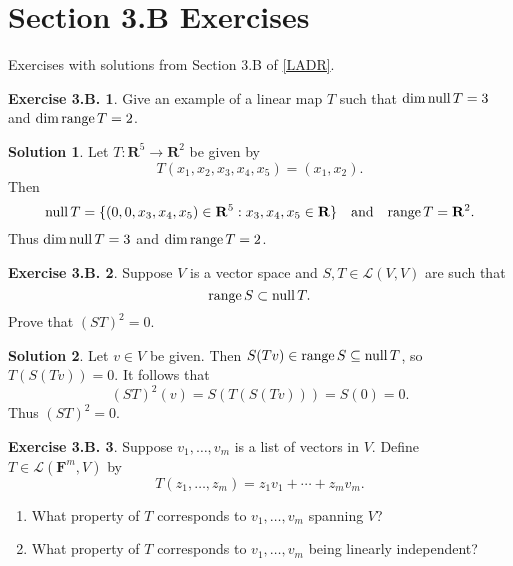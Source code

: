 \documentclass[12pt]{article}
\theoremstyle{definition}
\theoremstyle{exercise}
\newtheorem{exercise}{Exercise 3.B.}
\theoremstyle{solution}
\newtheorem*{solution}{Solution}
\newcommand{\lmap}{\mathcal{L}}
\newcommand{\Null}{\text{null\,}}
\newcommand{\Range}{\text{range\,}}
\newcommand{\quand}{\quad \text{and} \quad}
\newcommand{\R}{\mathbf{R}}
\newcommand{\F}{\mathbf{F}}
\begin{document}
\section{Section 3.B Exercises}

Exercises with solutions from Section 3.B of \hyperlink{ladr}{[LADR]}.

\begin{exercise}
\label{ex:1}
    Give an example of a linear map \( T \) such that \( \dim \Null T = 3 \) and \( \dim \Range T = 2 \).
\end{exercise}

\begin{solution}
    Let \( T : \R^5 \to \R^2 \) be given by
    \[
        T(x_1, x_2, x_3, x_4, x_5) = (x_1, x_2).
    \]
    Then
    \[
        \Null T = \{ (0, 0, x_3, x_4, x_5) \in \R^5 : x_3, x_4, x_5 \in \R \} \quand \Range T = \R^2.
    \]
    Thus \( \dim \Null T = 3 \) and \( \dim \Range T = 2 \).
\end{solution}

\begin{exercise}
\label{ex:2}
    Suppose \( V \) is a vector space and \( S, T \in \lmap(V, V) \) are such that
    \[
        \Range S \subset \Null T.
    \]
    Prove that \( (ST)^2 = 0 \).
\end{exercise}

\begin{solution}
    Let \( v \in V \) be given. Then \( S(Tv) \in \Range S \subseteq \Null T \), so \( T(S(Tv)) = 0 \). It follows that
    \[
        (ST)^2 (v) = S(T(S(Tv))) = S(0) = 0.
    \]
    Thus \( (ST)^2 = 0 \).
\end{solution}

\begin{exercise}
\label{ex:3}
    Suppose \( v_1, \ldots, v_m \) is a list of vectors in \( V \). Define \( T \in \lmap(\F^m, V) \) by
    \[
        T(z_1, \ldots, z_m) = z_1 v_1 + \cdots + z_m v_m.
    \]
    \begin{enumerate}
        \item What property of \( T \) corresponds to \( v_1, \ldots, v_m \) spanning \( V \)?

        \item What property of \( T \) corresponds to \( v_1, \ldots, v_m \) being linearly independent?
    \end{enumerate}
\end{exercise}
\end{document}
